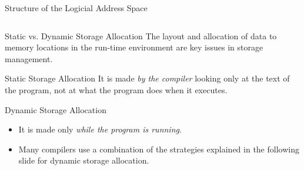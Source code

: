 \begin{bibunit}[apalike]
\begin{frame}[t]{Structure of the Logicial Address Space}
\begin{columns}
\begin{column}{.7\linewidth}
\begin{small}
			\end{small}
		\end{column}
	\end{columns}
\end{frame}

\begin{frame}{Static vs. Dynamic Storage Allocation}
	The layout and allocation of data to memory locations in the run-time environment are key issues in storage management.
	\vfill
	\begin{block}{Static Storage Allocation}
		It is made \emph{by the compiler} looking only at the text of the program, not at what the program does when it executes.
	\end{block}
	\vfill
	\begin{block}{Dynamic Storage Allocation}
		\begin{itemize}
		\item It is made only \emph{while the program is running}.
		\item Many compilers use a combination of the strategies explained in the following slide for dynamic storage allocation.
		\end{itemize}
	\end{block}
\end{frame}


\end{bibunit}
